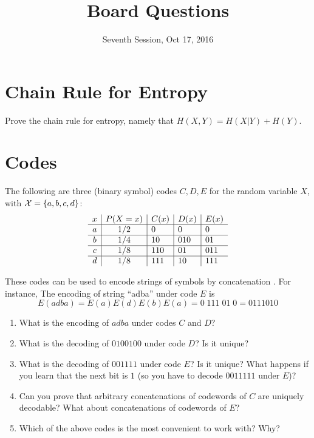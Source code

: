 \documentclass[11p,a4paper]{article}
\title{Board Questions}
\date{Seventh Session, Oct 17, 2016}
\begin{document}
\maketitle

\section{Chain Rule for Entropy}
Prove the chain rule for entropy, namely that $H(X,Y)=H(X|Y)+H(Y)$.

\section{Codes} \label{sec:codes}
The following are three (binary symbol) codes $C,D,E$ for the random variable $X$, with ${\cal X} = \{a,b,c,d\}$:
\[
\begin{array}{c | c | l | l | l}
x & P(X=x) & C(x) & D(x) & E(x)\\
\hline
a & 1/2 & 0   & 0   & 0   \\
\hline
b & 1/4 & 10  & 010 & 01  \\
\hline
c & 1/8 & 110 & 01  & 011 \\
\hline
d & 1/8 & 111 & 10  & 111
\end{array}
\]

These codes can be used to encode strings of symbols by concatenation . For instance,
The encoding of string ``adba'' under code $E$ is
\[
E(adba) = E(a) E(d) E(b) E(a) = 0 \; 111 \; 01 \; 0 = 0111010
\]

\begin{enumerate}
\item What is the encoding of $adba$ under codes $C$ and $D$?
\item What is the decoding of $0100100$ under code $D$? Is it unique?
\item What is the decoding of $001111$ under code $E$? Is it unique?
  What happens if you learn that the next bit is $1$ (so you have to decode
  $0011111$ under $E$)?
\item Can you prove that arbitrary concatenations of codewords of $C$
  are uniquely decodable? What about concatenations of codewords of
  $E$?
\item Which of the above codes is the most convenient to work with? Why?
\end{enumerate}
\end{document}
